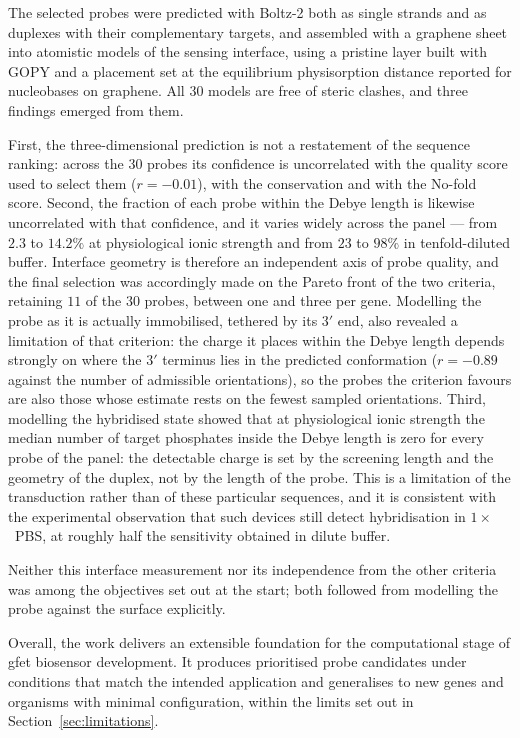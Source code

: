 The selected probes were predicted with Boltz-2 both as single strands and as duplexes with their
complementary targets, and assembled with a graphene sheet into atomistic models of the sensing
interface, using a pristine layer built with GOPY and a placement set at the equilibrium
physisorption distance reported for nucleobases on graphene. All $30$ models are free of steric
clashes, and three findings emerged from them.

First, the three-dimensional prediction is not a restatement of the sequence ranking: across the
$30$ probes its confidence is uncorrelated with the quality score used to select them
($r = -0.01$), with the conservation and with the No-fold score. Second, the fraction of each probe
within the Debye length is likewise uncorrelated with that confidence, and it varies widely across
the panel --- from $2.3$ to $14.2\%$ at physiological ionic strength and from $23$ to $98\%$ in
tenfold-diluted buffer. Interface geometry is therefore an independent axis of probe quality, and
the final selection was accordingly made on the Pareto front of the two criteria, retaining $11$ of
the $30$ probes, between one and three per gene. Modelling the probe as it is actually immobilised,
tethered by its $3'$ end, also revealed a limitation of that criterion: the charge it places within
the Debye length depends strongly on where the $3'$ terminus lies in the predicted conformation
($r = -0.89$ against the number of admissible orientations), so the probes the criterion favours are
also those whose estimate rests on the fewest sampled orientations. Third, modelling the hybridised state showed that
at physiological ionic strength the median number of target phosphates inside the Debye length is
zero for every probe of the panel: the detectable charge is set by the screening length and the
geometry of the duplex, not by the length of the probe. This is a limitation of the transduction
rather than of these particular sequences, and it is consistent with the experimental observation
that such devices still detect hybridisation in $1\times$~PBS, at roughly half the sensitivity
obtained in dilute buffer.

Neither this interface measurement nor its independence from the other criteria was among the
objectives set out at the start; both followed from modelling the probe against the surface
explicitly.

Overall, the work delivers an extensible foundation for the computational stage of
\acrshort{gfet} biosensor development. It produces prioritised probe candidates under conditions
that match the intended application and generalises to new genes and organisms with minimal
configuration, within the limits set out in Section~\ref{sec:limitations}.

